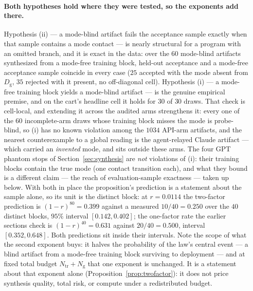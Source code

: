 \documentclass[11pt]{article}
\theoremstyle{definition}
\theoremstyle{remark}
\begin{document}
\paragraph{Both hypotheses hold where they were tested, so the exponents add there.} Hypothesis (ii) --- a mode-blind artifact fails the acceptance sample exactly when that sample contains a mode contact --- is nearly structural for a program with an omitted branch, and it is exact in the data: over the $60$ mode-blind artifacts synthesized from a mode-free training block, held-out acceptance and a mode-free acceptance sample coincide in every case ($25$ accepted with the mode absent from $D_{\mathrm{g}}$, $35$ rejected with it present, no off-diagonal cell). Hypothesis (i) --- a mode-free training block yields a mode-blind artifact --- is the genuine empirical premise, and on the cart's headline cell it holds for $30$ of $30$ draws. That check is cell-local, and extending it across the audited arms strengthens it: every one of the $60$ incomplete-arm draws whose training block misses the mode is probe-blind, so (i) has no known violation among the $1034$ API-arm artifacts, and the nearest counterexample to a global reading is the agent-relayed Claude artifact --- which carried an \emph{invented} mode, and sits outside these arms. The four GPT phantom stops of Section~\ref{sec:synthesis} are \emph{not} violations of (i): their training blocks contain the true mode (one contact transition each), and what they bound is a different claim --- the reach of evaluation-sample exactness --- taken up below. With both in place the proposition's prediction is a statement about the sample alone, so its unit is the distinct block: at $r = 0.0114$ the two-factor prediction is $(1-r)^{80} = 0.399$ against a measured $10/40 = 0.250$ over the $40$ distinct blocks, $95\%$ interval $[0.142, 0.402]$; the one-factor rate the earlier sections check is $(1-r)^{40} = 0.631$ against $20/40 = 0.500$, interval $[0.352, 0.648]$. Both predictions sit inside their intervals. Note the scope of what the second exponent buys: it halves the probability of the law's central event --- a blind artifact from a mode-free training block surviving to deployment --- and at fixed total budget $N_{\mathrm{tr}} + N_{\mathrm{g}}$ that one exponent is unchanged. It is a statement about that exponent alone (Proposition~\ref{prop:twofactor}): it does not price synthesis quality, total risk, or compute under a redistributed budget.
\end{document}
